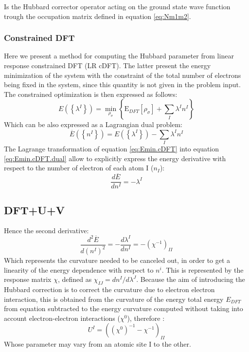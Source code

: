 Is the Hubbard corrector operator acting on the ground state wave function trough the occupation matrix defined in equation \ref{eq:Nm1m2}. 
\subsubsection{Constrained DFT}

Here we present a method for computing the Hubbard parameter from linear response constrained DFT (LR cDFT). The latter present the energy minimization of the system with the constraint of the total number of electrons being fixed in the system, since this quantity is not given in the problem input. The constrained optimization is then expressed as follows:
\begin{equation}
E \left( \left\{ \lambda^I \right\} \right) = 
\underset{\rho _{\sigma }}{\min} \left\{ \mbox{E}_{DFT}\left[ \rho _{\sigma } \right]+ \sum_{I}{\lambda ^{I}n^{I}} \right\}
\label{eq:Emin.cDFT}
\end{equation}
Which can be also expressed as a Lagrangian dual problem:
\begin{equation}
\overline{E} \left( \left\{ n^I \right\} \right) = 
E \left( \left\{ \lambda^I \right\} \right)
-\sum_{I}{\lambda ^{I}n^{I}} 
\label{eq:Emin.cDFT.dual}
\end{equation}
The Lagrange transformation of equation \ref{eq:Emin.cDFT} into equation \ref{eq:Emin.cDFT.dual} allow to explicitly express the energy derivative with respect to the number of electron of each atom I ($n_I$):
\begin{equation}
\frac{d \overline{E}}{d n^I}= -\lambda^I
\label{eq:dEdlambda}
\end{equation}
\subsection{DFT+U+V}
Hence the second derivative:
\begin{equation}
\frac{d^2 \overline{E}}{d (n^I)^2}
= -\frac{d \lambda^I}{d n^I} = -(\chi^{-1})_{II}
\label{eq:d2Edlambda2}
\end{equation}
Which represents the curvature needed to be canceled out, in order to get a linearity of the energy dependence with respect to $n^i$. This is represented by the response matrix $\chi$, defined as $\chi_{I J}= d n^I/d \lambda^J$. Because the aim of introducing the Hubbard correction is to correct the curvature due to electron electron interaction, this is obtained from the curvature of the energy total energy $E_{DFT}$ from equation subtracted to the energy curvature computed without taking into account electron-electron interactions ($\chi^0$), therefore :
\begin{equation}
U^I = ((\chi^0)^{-1} - \chi^{-1})_{II}
\label{eq:hubbardparam}
\end{equation}
Whose parameter may vary from an atomic site I to the other.
